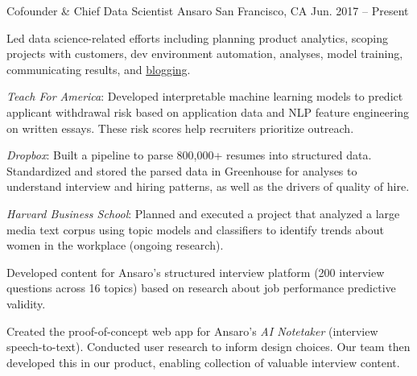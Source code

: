 

\begin{cventries}

  \cventry
    {Cofounder \& Chief Data Scientist} %
    {Ansaro} %
    {San Francisco, CA} %
    {Jun. 2017 -- Present} %
    {
      \begin{cvitems} %
        \item {Led data science-related efforts including planning product analytics, scoping projects with customers, dev environment automation, analyses, model training, communicating results, and {\href{https://medium.com/ansaro-blog}{blogging}}.}
        \item {\textit{Teach For America}: Developed interpretable machine learning models to predict applicant withdrawal risk based on application data and NLP feature engineering on written essays. These risk scores help recruiters prioritize outreach.}
        \item {\textit{Dropbox}: Built a pipeline to parse 800,000+ resumes into structured data. Standardized and stored the parsed data in Greenhouse for analyses to understand interview and hiring patterns, as well as the drivers of quality of hire.}
        \item {\textit{Harvard Business School}: Planned and executed a project that analyzed a large media text corpus using topic models and classifiers to identify trends about women in the workplace (ongoing research).}
        \item {Developed content for Ansaro's structured interview platform (200 interview questions across 16 topics) based on research about job performance predictive validity.} %
        \item {Created the proof-of-concept web app for Ansaro's \textit{AI Notetaker} (interview speech-to-text). Conducted user research to inform design choices. Our team then developed this in our product, enabling collection of valuable interview content.}
     \end{cvitems}
    }


\end{cventries}
